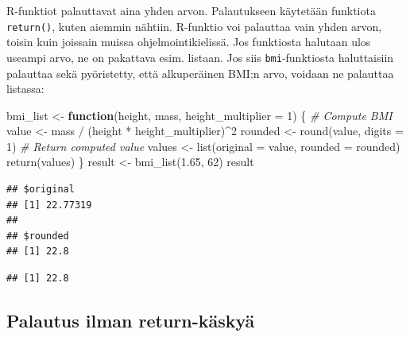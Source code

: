 \documentclass[
]{book}
\newenvironment{Shaded}{\begin{snugshade}}{\end{snugshade}}
\newcommand{\AttributeTok}[1]{\textcolor[rgb]{0.77,0.63,0.00}{#1}}
\newcommand{\CommentTok}[1]{\textcolor[rgb]{0.56,0.35,0.01}{\textit{#1}}}
\newcommand{\ControlFlowTok}[1]{\textcolor[rgb]{0.13,0.29,0.53}{\textbf{#1}}}
\newcommand{\DecValTok}[1]{\textcolor[rgb]{0.00,0.00,0.81}{#1}}
\newcommand{\FloatTok}[1]{\textcolor[rgb]{0.00,0.00,0.81}{#1}}
\newcommand{\FunctionTok}[1]{\textcolor[rgb]{0.00,0.00,0.00}{#1}}
\newcommand{\NormalTok}[1]{#1}
\newcommand{\OtherTok}[1]{\textcolor[rgb]{0.56,0.35,0.01}{#1}}
\newcommand{\SpecialCharTok}[1]{\textcolor[rgb]{0.00,0.00,0.00}{#1}}
\begin{document}
R-funktiot palauttavat aina yhden arvon. Palautukseen käytetään funktiota \texttt{return()}, kuten aiemmin nähtiin. R-funktio voi palauttaa vain yhden arvon, toisin kuin joissain muissa ohjelmointikielissä. Jos funktiosta halutaan ulos useampi arvo, ne on pakattava esim. listaan. Jos siis \texttt{bmi}-funktiosta haluttaisiin palauttaa sekä pyöristetty, että alkuperäinen BMI:n arvo, voidaan ne palauttaa listassa:

\begin{Shaded}
\begin{Highlighting}[]
\NormalTok{bmi\_list }\OtherTok{\textless{}{-}} \ControlFlowTok{function}\NormalTok{(height, mass, }\AttributeTok{height\_multiplier =} \DecValTok{1}\NormalTok{) \{}
  \CommentTok{\# Compute BMI}
\NormalTok{  value }\OtherTok{\textless{}{-}}\NormalTok{ mass }\SpecialCharTok{/}\NormalTok{ (height }\SpecialCharTok{*}\NormalTok{ height\_multiplier)}\SpecialCharTok{\^{}}\DecValTok{2}
\NormalTok{  rounded }\OtherTok{\textless{}{-}} \FunctionTok{round}\NormalTok{(value, }\AttributeTok{digits =} \DecValTok{1}\NormalTok{)}
  \CommentTok{\# Return computed value}
\NormalTok{  values }\OtherTok{\textless{}{-}} \FunctionTok{list}\NormalTok{(}\AttributeTok{original =}\NormalTok{ value,}
                 \AttributeTok{rounded =}\NormalTok{ rounded)}
  \FunctionTok{return}\NormalTok{(values)}
\NormalTok{\}}
\NormalTok{result }\OtherTok{\textless{}{-}} \FunctionTok{bmi\_list}\NormalTok{(}\FloatTok{1.65}\NormalTok{, }\DecValTok{62}\NormalTok{)}
\NormalTok{result}
\end{Highlighting}
\end{Shaded}

\begin{verbatim}
## $original
## [1] 22.77319
## 
## $rounded
## [1] 22.8
\end{verbatim}

\begin{Shaded}
\end{Shaded}

\begin{verbatim}
## [1] 22.8
\end{verbatim}

\hypertarget{palautus-ilman-return-kuxe4skyuxe4}{%
\subsection{Palautus ilman return-käskyä}\label{palautus-ilman-return-kuxe4skyuxe4}}
\end{document}
